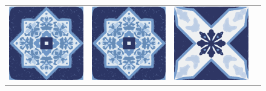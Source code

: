 \documentclass{oci}
\begin{document}
\begin{problemDescription}
\begin{figure}[h]
  \begin{center}
    {
      \renewcommand{\arraystretch}{0.25}
      \begin{tabular}{cccc}
        \includegraphics[scale=0.3]{a.eps} &
        \includegraphics[scale=0.3]{a.eps} &
        \includegraphics[scale=0.3]{b.eps} \\

\end{tabular}}
\end{center}
\end{figure}
\end{problemDescription}
\end{document}
